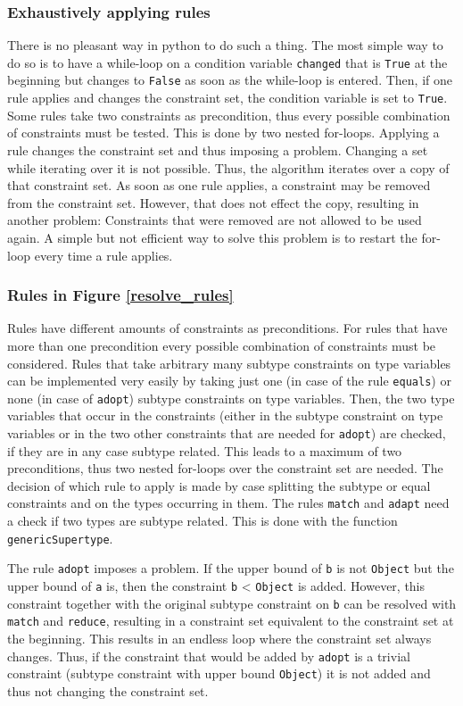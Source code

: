 \subsubsection{Exhaustively applying rules}
There is no pleasant way in python to do such a thing. The most simple way to do so is to have a while-loop on a condition variable \verb|changed| that is \verb|True| at the beginning but changes to \verb|False| as soon as the while-loop is entered. Then, if one rule applies and changes the constraint set, the condition variable is set to \verb|True|.
Some rules take two constraints as precondition, thus every possible combination of constraints must be tested. This is done by two nested for-loops.
Applying a rule changes the constraint set and thus imposing a problem. Changing a set while iterating over it is not possible. Thus, the algorithm iterates over a copy of that constraint set. As soon as one rule applies, a constraint may be removed from the constraint set. However, that does not effect the copy, resulting in another problem: Constraints that were removed are not allowed to be used again.
A simple but not efficient way to solve this problem is to restart the for-loop every time a rule applies.

\subsubsection{Rules in Figure \ref{resolve_rules}}
Rules have different amounts of constraints as preconditions. For rules that have more than one precondition every possible combination of constraints must be considered. Rules that take arbitrary many subtype constraints on type variables can be implemented very easily by taking just one (in case of the rule \verb|equals|) or none (in case of \verb|adopt|) subtype constraints on type variables.
Then, the two type variables that occur in the constraints (either in the subtype constraint on type variables or in the two other constraints that are needed for \verb|adopt|) are checked, if they are in any case subtype related.
This leads to a maximum of two preconditions, thus two nested for-loops over the constraint set are needed.
The decision of which rule to apply is made by case splitting the subtype or equal constraints and on the types occurring in them.
The rules \verb|match| and \verb|adapt| need a check if two types are subtype related. This is done with the function \verb|genericSupertype|.

The rule \verb|adopt| imposes a problem. If the upper bound of \verb|b| is not \verb|Object| but the upper bound of \verb|a| is, then the constraint \verb|b| < \verb|Object| is added. However, this constraint together with the original subtype constraint on \verb|b| can be resolved with \verb|match| and \verb|reduce|, resulting in a constraint set equivalent to the constraint set at the beginning.
This results in an endless loop where the constraint set always changes. Thus, if the constraint that would be added by \verb|adopt| is a trivial constraint (subtype constraint with upper bound \verb|Object|) it is not added and thus not changing the constraint set.

